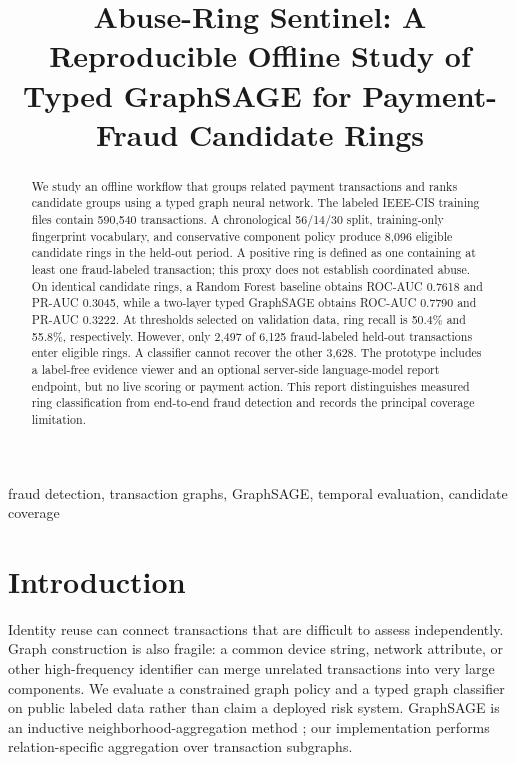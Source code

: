 \documentclass[conference]{IEEEtran}
\begin{document}
\title{Abuse-Ring Sentinel: A Reproducible Offline Study of Typed GraphSAGE for Payment-Fraud Candidate Rings}
\author{}
\maketitle

\begin{abstract}
We study an offline workflow that groups related payment transactions and ranks candidate groups using a typed graph neural network. The labeled IEEE-CIS training files contain 590,540 transactions. A chronological 56/14/30 split, training-only fingerprint vocabulary, and conservative component policy produce 8,096 eligible candidate rings in the held-out period. A positive ring is defined as one containing at least one fraud-labeled transaction; this proxy does not establish coordinated abuse. On identical candidate rings, a Random Forest baseline obtains ROC-AUC 0.7618 and PR-AUC 0.3045, while a two-layer typed GraphSAGE obtains ROC-AUC 0.7790 and PR-AUC 0.3222. At thresholds selected on validation data, ring recall is 50.4\% and 55.8\%, respectively. However, only 2,497 of 6,125 fraud-labeled held-out transactions enter eligible rings. A classifier cannot recover the other 3,628. The prototype includes a label-free evidence viewer and an optional server-side language-model report endpoint, but no live scoring or payment action. This report distinguishes measured ring classification from end-to-end fraud detection and records the principal coverage limitation.
\end{abstract}

\begin{IEEEkeywords}
fraud detection, transaction graphs, GraphSAGE, temporal evaluation, candidate coverage
\end{IEEEkeywords}

\section{Introduction}
Identity reuse can connect transactions that are difficult to assess independently. Graph construction is also fragile: a common device string, network attribute, or other high-frequency identifier can merge unrelated transactions into very large components. We evaluate a constrained graph policy and a typed graph classifier on public labeled data rather than claim a deployed risk system. GraphSAGE is an inductive neighborhood-aggregation method \cite{graphsage}; our implementation performs relation-specific aggregation over transaction subgraphs.
\end{document}
